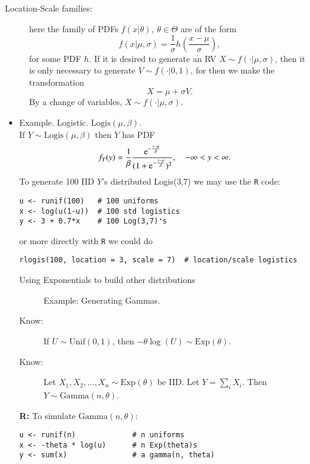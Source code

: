 \documentclass[captions=tableheading]{scrbook}
\begin{document}
\begin{description}
\item[Location-Scale families:] here the family of PDFs $f(x|\theta),\ \theta\in\Theta$ are of the form 
  \[
  f(x|\mu,\sigma)=\frac{1}{\sigma}h\left(\frac{x-\mu}{\sigma}\right),
  \]
  for some PDF $h$. If it is desired to generate an RV $X\sim f(\cdot|\mu,\sigma)$, then it is only necessary to generate $V\sim f(\cdot|0,1)$, for then we make the transformation 
  \[
  X = \mu + \sigma V.
  \]
  By a change of variables, \( X \sim f(\cdot|\mu,\sigma) \).
\end{description}
\begin{itemize}

\item Example. Logistic. \( \mathrm{Logis}(\mu,\beta) \).\\
\label{sec-2_3_2_1}%
If \( Y \sim \mathrm{Logis}(\mu,\beta) \) then $Y$ has PDF
\[
f_{Y}(y)=\frac{1}{\beta}\frac{\mathrm{e}^{-\frac{y-\mu}{\beta}}}{(1 + \mathrm{e}^{-\frac{y-\mu}{\beta}})^{2}},\quad -\infty< y <\infty.
\]
To generate 100 IID $Y$'s distributed Logis(3,7) we may use the \texttt{R} code:

\begin{verbatim}
u <- runif(100)   # 100 uniforms
x <- log(u(1-u))  # 100 std logistics
y <- 3 + 0.7*x    # 100 Log(3,7)'s
\end{verbatim}

or more directly with \texttt{R} we could do
\begin{verbatim}
rlogis(100, location = 3, scale = 7)  # location/scale logistics
\end{verbatim}


\begin{description}
\item[Using Exponentials to build other distributions] Example: Generating Gammas.
\item[Know:] If \(U \sim\mathrm{Unif}(0,1)\), then \( -\theta\log(U)\sim\mathrm{Exp}(\theta) \).
\item[Know:] Let $X_{1},X_{2},\ldots,X_{n}\sim\mathrm{Exp}(\theta)$ be IID.  Let $Y=\sum_{i}X_{i}$. Then $Y\sim\mathrm{Gamma}(n,\theta)$.
\end{description}

\textbf{R:} To simulate \( \mathrm{Gamma}(n,\theta) \):
\begin{verbatim}
u <- runif(n)             # n uniforms
x <- -theta * log(u)      # n Exp(theta)s
y <- sum(x)               # a gamma(n, theta)
\end{verbatim}


\end{itemize}
\end{document}
